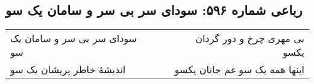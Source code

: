 \begin{center}
\section*{رباعی شماره ۵۹۶: سودای سر بی سر و سامان یک سو}
\label{sec:sh596}
\begin{longtable}{l p{0.5cm} r}
سودای سر بی سر و سامان یک سو
&&
بی مهری چرخ و دور گردان یکسو
\\
اندیشهٔ خاطر پریشان یک سو
&&
اینها همه یک سو غم جانان یکسو
\\
\end{longtable}
\end{center}
